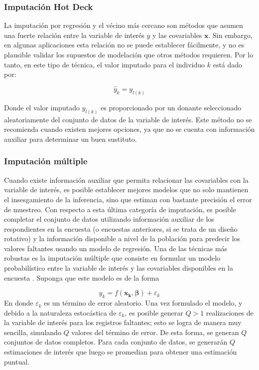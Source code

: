 \documentclass[12pt,spanish,]{book}
\begin{document}
\hypertarget{imputacion-hot-deck}{%
\subsubsection*{Imputación Hot Deck}\label{imputacion-hot-deck}}

La imputación por regresión y el vécino más cercano son métodos que asumen una fuerte relación entre la variable de interés \(y\) y las covariables \(\mathbf{x}\). Sin embargo, en algunas aplicaciones esta relación no se puede establecer fácilmente, y no es plausible validar los supuestos de modelación que otros métodos requieren. Por lo tanto, en este tipo de técnica, el valor imputado para el individuo \(k\) está dado por:

\[\hat{y}_k = y_{l(k)}\]

Donde el valor imputado \(y_{l(k)}\) es proporcionado por un donante seleccionado aleatoriamente del conjunto de datos de la variable de interés. Este método no se recomienda cuando existen mejores opciones, ya que no se cuenta con información auxiliar para determinar un buen sustituto.

\hypertarget{imputacion-multiple}{%
\subsubsection*{Imputación múltiple}\label{imputacion-multiple}}

Cuando existe información auxiliar que permita relacionar las covariables con la variable de interés, es posible establecer mejores modelos que no solo mantienen el insesgamiento de la inferencia, sino que estiman con bastante precisión el error de muestreo. Con respecto a esta última categoría de imputación, es posible completar el conjunto de datos utilizando información auxiliar de los respondientes en la encuesta (o encuestas anteriores, si se trata de un diseño rotativo) y la información disponible a nivel de la población para predecir los valores faltantes usando un modelo de regresión. Una de las técnicas más robustas es la imputación múltiple que consiste en formular un modelo probabilístico entre la variable de interés y las covariables disponibles en la encuesta \autocite{Rubin_1987}. Suponga que este modelo es de la forma

\[y_k = f(\mathbf{x_k},\boldsymbol{\beta}) + \varepsilon_k \]
En donde \(\varepsilon_k\) es un término de error aleatorio. Una vez formulado el modelo, y debido a la naturaleza estocástica de \(\varepsilon_k\), es posible generar \(Q>1\) realizaciones de la variable de interés para los registros faltantes; esto se logra de manera muy sencilla, simulando \(Q\) valores del término de error. De esta forma, se generan \(Q\) conjuntos de datos completos. Para cada conjunto de datos, se generarán \(Q\) estimaciones de interés que luego se promedian para obtener una estimación puntual.
\end{document}
